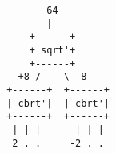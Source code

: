 \begin{center}
\begin{BVerbatim}
        64
        |
     +------+
     + sqrt'+
     +------+
   +8 /    \ -8
 +------+  +------+
 | cbrt'|  | cbrt'|
 +------+  +------+
  | | |      | | |
  2 . .     -2 . .        
\end{BVerbatim}
\end{center}

